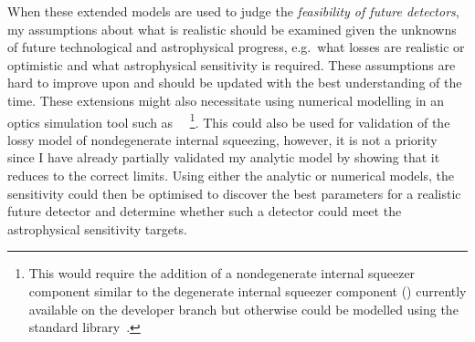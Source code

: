 When these extended models are used to judge the \emph{feasibility of future detectors}, my assumptions about what is realistic should be examined given the unknowns of future technological and astrophysical progress, e.g.\ what losses are realistic or optimistic and what astrophysical sensitivity is required. These assumptions are hard to improve upon and should be updated with the best understanding of the time.
These extensions might also necessitate using numerical modelling in an optics simulation tool such as ~\cite{finesse}~\footnote{This would require the addition of a nondegenerate internal squeezer component similar to the degenerate internal squeezer component () currently available on the  developer branch but otherwise could be modelled using the standard library~\cite{BROWN_PYKAT}.}. This could also be used for validation of the lossy model of nondegenerate internal squeezing, however, it is not a priority since I have already partially validated my analytic model by showing that it reduces to the correct limits. %
Using either the analytic or numerical models, the sensitivity could then be optimised to discover the best parameters for a realistic future detector and determine whether such a detector could meet the astrophysical sensitivity targets. %


